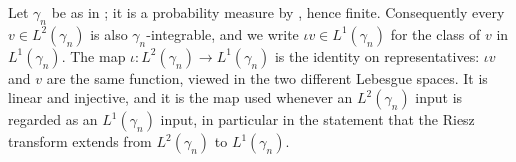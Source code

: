 \begin{definition}
Let $\gamma_n$ be as in ; it is a probability measure by
, hence finite.  Consequently every $v \in L^2(\gamma_n)$ is
also $\gamma_n$-integrable, and we write $\iota v \in L^1(\gamma_n)$ for the class
of $v$ in $L^1(\gamma_n)$.  The map $\iota : L^2(\gamma_n) \to L^1(\gamma_n)$ is
the identity on representatives: $\iota v$ and $v$ are the same function, viewed
in the two different Lebesgue spaces.  It is linear and injective, and it is the
map used whenever an $L^2(\gamma_n)$ input is regarded as an $L^1(\gamma_n)$ input,
in particular in the statement that the Riesz transform extends from
$L^2(\gamma_n)$ to $L^1(\gamma_n)$.
\end{definition}
